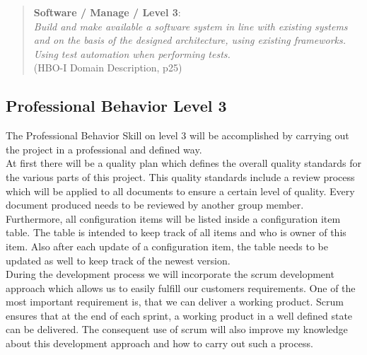 \begin{quote}
	\textbf{Software / Manage / Level 3}: \\
	\textit{
		Build and make available a software system in line with existing systems and on the basis of the designed architecture, using existing frameworks.
		Using test automation when performing tests.
	} \\ (HBO-I Domain Description, p25)
\end{quote}


\subsection{Professional Behavior Level 3}

The Professional Behavior Skill on level 3 will be accomplished by carrying out the project in a professional and defined way. \\
At first there will be a quality plan which defines the overall quality standards for the various parts of this project.
This quality standards include a review process which will be applied to all documents to ensure a certain level of quality. 
Every document produced needs to be reviewed by another group member. \\

Furthermore, all configuration items will be listed inside a configuration item table. The table is intended to keep track of all items and who is owner of this item. Also after each update of a configuration item, the table needs to be updated as well to keep track of the newest version. \\

During the development process we will incorporate the scrum development approach which allows us to easily fulfill our customers requirements. One of the most important requirement is, that we can deliver a working product. Scrum ensures that at the end of each sprint, a working product in a well defined state can be delivered. The consequent use of scrum will also improve my knowledge about this development approach and how to carry out such a process.

